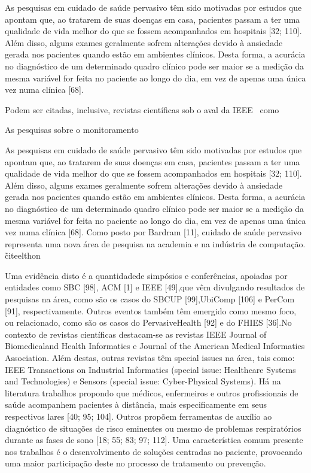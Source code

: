 As pesquisas em cuidado de saúde pervasivo têm sido motivadas por estudos que apontam que, ao tratarem de suas doenças em casa, pacientes passam a ter uma qualidade de vida melhor do que se fossem acompanhados em hospitais [32; 110]. Além disso, alguns exames geralmente sofrem alterações devido à ansiedade gerada nos pacientes quando estão em ambientes clínicos. Desta forma, a acurácia no diagnóstico de um determinado quadro clínico pode ser maior se a medição da mesma variável for feita no paciente ao longo do dia, em vez de apenas uma única vez numa clínica [68].


Podem ser citadas, inclusive, revistas científicas sob o aval da IEEE~\cite{ieee2016} como 


 As pesquisas sobre o monitoramento 

As pesquisas em cuidado de saúde pervasivo têm sido motivadas por estudos que apontam
que, ao tratarem de suas doenças em casa, pacientes passam a ter uma qualidade de vida
melhor do que se fossem acompanhados em hospitais [32; 110]. Além disso, alguns exames
geralmente sofrem alterações devido à ansiedade gerada nos pacientes quando estão em
ambientes clínicos. Desta forma, a acurácia no diagnóstico de um determinado quadro clínico
pode ser maior se a medição da mesma variável for feita no paciente ao longo do dia, em vez
de apenas uma única vez numa clínica [68].
Como posto por Bardram [11], cuidado de saúde pervasivo representa uma nova área
de pesquisa na academia e na indústria de computação. \~cite{elthon}


Uma evidência disto é a quantidadede simpósios e conferências, apoiadas por entidades como SBC [98], ACM [1] e IEEE [49],que vêm divulgando resultados de pesquisas na área, como são os casos do SBCUP [99],UbiComp [106] e PerCom [91], respectivamente. Outros eventos também têm emergido como mesmo foco, ou relacionado, como são os casos do PervasiveHealth [92] e do FHIES [36].No contexto de revistas científicas destacam-se as revistas IEEE Journal of Biomedicaland Health Informatics e Journal of the American Medical Informatics Association. Além destas, outras revistas têm special issues na área, tais como: IEEE Transactions on Industrial
Informatics (special issue: Healthcare Systems and Technologies) e Sensors (special issue: Cyber-Physical Systems). Há na literatura trabalhos propondo que médicos, enfermeiros e outros profissionais de saúde acompanhem pacientes à distância, mais especificamente em seus respectivos lares [40; 95; 104]. Outros propõem ferramentas de auxílio ao diagnóstico de situações de risco eminentes ou mesmo de problemas respiratórios durante as fases de sono [18; 55; 83; 97; 112]. Uma característica comum presente nos trabalhos é o desenvolvimento de soluções centradas no paciente, provocando uma maior participação deste no processo de tratamento
ou prevenção. ~\cite{elhton}

